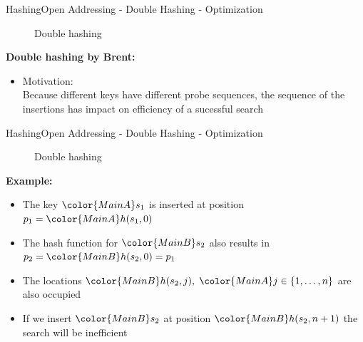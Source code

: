 \begin{frame}{Hashing}{Open Addressing - Double Hashing - Optimization}
  \vspace{-2.0em}
  \begin{figure}[!h]
    \begin{adjustbox}{width=0.9\linewidth}%
    \end{adjustbox}
    \vspace{-1.0em}
    \caption{Double hashing}%
    \label{fig:hashing:open_addressing:double_hashing_no_brent}%
  \end{figure}
  \textbf{Double hashing by Brent:}
  \begin{itemize}
    \item<2-> Motivation:\\
      Because different keys have different probe sequences,
      the sequence of the insertions has impact on efficiency of a sucessful search
  \end{itemize}
\end{frame}


\begin{frame}{Hashing}{Open Addressing - Double Hashing - Optimization}
  \vspace{-2.0em}
  \begin{figure}[!h]
    \begin{adjustbox}{width=0.9\linewidth}%
    \end{adjustbox}
    \vspace{-1.0em}
    \caption{Double hashing}%
    \label{fig:hashing:open_addressing:double_hashing_no_brent2}%
  \end{figure}
  \vspace{-1.0em}
  \textbf{Example:}
  \begin{itemize}
    \item<1->
      The key ${\color{MainA}s_1}$ is inserted at position
      \begin{math}
        p_1 = {\color{MainA}h(s_1, 0)}
      \end{math}
    \item<2->
      The hash function for ${\color{MainB}s_2}$ also results in
      \begin{math}
        p_2 = {\color{MainB}h(s_2, 0)} = p_1
      \end{math}
    \item<3->
      The locations
      \begin{math}
        {\color{MainB}h(s_2, j)}, \;
        {\color{MainA}j} \in \{1,\dots,n\}
      \end{math}
      are also occupied
    \item<6->
      If we insert ${\color{MainB}s_2}$ at position
      ${\color{MainB}h(s_2, n + 1)}$ the search will be inefficient
  \end{itemize}
\end{frame}

